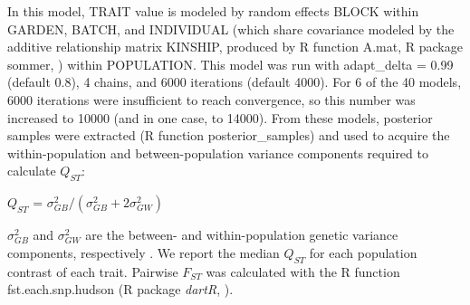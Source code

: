 \documentclass[9pt,twocolumn,twoside,lineno]{biorxiv}
\begin{document}
\noindent In this model, TRAIT value is modeled by random effects BLOCK within GARDEN, BATCH, and INDIVIDUAL (which share covariance modeled by the additive relationship matrix KINSHIP, produced by R function A.mat, R package sommer, \citep{covarrubias2016genome}) within POPULATION.
This model was run with adapt\_delta = 0.99 (default 0.8), 4 chains, and 6000 iterations (default 4000).
For 6 of the 40 models, 6000 iterations were insufficient to reach convergence, so this number was increased to 10000 (and in one case, to 14000).
From these models, posterior samples were extracted (R function posterior\_samples) and used to acquire the within-population and between-population variance components required to calculate $Q_{ST}$:
\begin{center}
$Q_{ST}$ = \(\sigma^{2}_{GB}/(\sigma^{2}_{GB}+2\sigma^{2}_{GW})\)
\end{center}
\noindent $\sigma^{2}_{GB}$ and $\sigma^{2}_{GW}$ are the between- and within-population genetic variance components, respectively \cite{Leinonen2013-ic}.
We report the median $Q_{ST}$ for each population contrast of each trait.
Pairwise $F_{ST}$ was calculated with the R function fst.each.snp.hudson (R package \textit{dartR}, \citealp{gruber2018dartr}).
\end{document}
